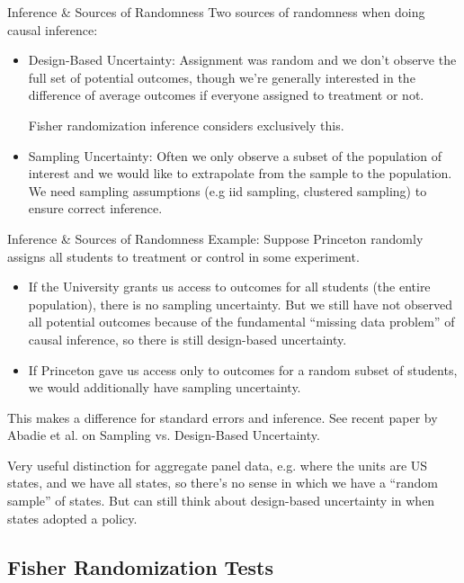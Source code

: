 \documentclass[aspectratio=169, handout]{beamer}
\begin{document}
{\footnotesize
\begin{frame}{Inference \& Sources of Randomness}
Two sources of randomness when doing causal inference:
\begin{itemize}
  \item \alert{Design}-Based Uncertainty:
    \alert{Assignment} was random and we don't observe the full set of
    potential outcomes, though we're generally interested in the
    difference of average outcomes if \alert{everyone} assigned to
    treatment or not.

    Fisher randomization inference considers exclusively this.

  \item \alert{Sampling} Uncertainty:
    Often we only observe a subset of the population of interest and
    we would like to extrapolate from the sample to the population.
    We need \alert{sampling assumptions} (e.g iid sampling, clustered
    sampling) to ensure correct inference.
\end{itemize}
\end{frame}
}

{\footnotesize
\begin{frame}{Inference \& Sources of Randomness}
Example:
Suppose Princeton randomly assigns all students to treatment or control
in some experiment.
\begin{itemize}
  \item If the University grants us access to outcomes for \alert{all}
    students (the entire population), there is no sampling uncertainty.
    But we still have not observed all potential outcomes
    because of the fundamental ``missing data problem'' of causal
    inference, so there is still design-based uncertainty.
  \item If Princeton gave us access only to outcomes for a random subset
    of students, we would additionally have sampling uncertainty.
\end{itemize}
This makes a difference for standard errors and inference.
See recent paper by Abadie et al. on Sampling vs. Design-Based
Uncertainty.

Very useful distinction for aggregate panel data, e.g. where the
units are US states, and we have all states, so there's no sense in
which we have a ``random sample'' of states.
But can still think about design-based uncertainty in when states
adopted a policy.
\end{frame}
}


\subsection{Fisher Randomization Tests}
\end{document}
